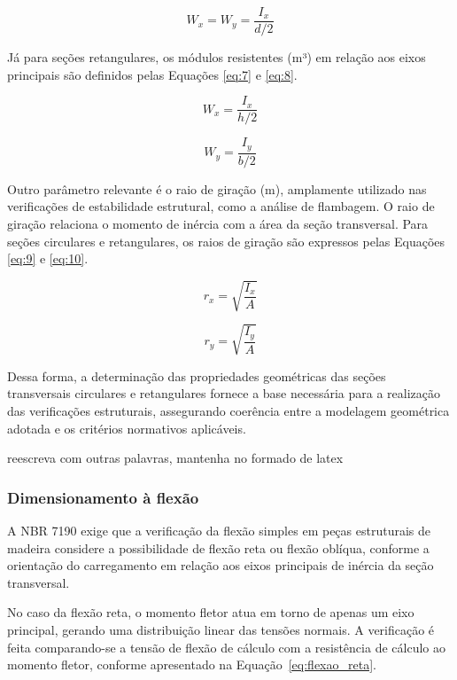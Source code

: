 \begin{equation}
W_x = W_y = \frac{I_x}{d/2}
\label{eq:6}
\end{equation}

Já para seções retangulares, os módulos resistentes (m³) em relação aos eixos principais são definidos pelas Equações \eqref{eq:7} e \eqref{eq:8}.

\begin{equation}
W_x = \frac{I_x}{h/2}
\label{eq:7}
\end{equation}

\begin{equation}
W_y = \frac{I_y}{b/2}
\label{eq:8}
\end{equation}

Outro parâmetro relevante é o raio de giração (m), amplamente utilizado nas verificações de estabilidade estrutural, como a análise de flambagem. O raio de giração relaciona o momento de inércia com a área da seção transversal. Para seções circulares e retangulares, os raios de giração são expressos pelas Equações \eqref{eq:9} e \eqref{eq:10}.

\begin{equation}
r_x = \sqrt{\frac{I_x}{A}}
\label{eq:9}
\end{equation}

\begin{equation}
r_y = \sqrt{\frac{I_y}{A}}
\label{eq:10}
\end{equation}

Dessa forma, a determinação das propriedades geométricas das seções transversais circulares e retangulares fornece a base necessária para a realização das verificações estruturais, assegurando coerência entre a modelagem geométrica adotada e os critérios normativos aplicáveis.

reescreva com outras palavras, mantenha no formado de latex 

\subsubsection{Dimensionamento à flexão}

A NBR 7190 \parencite{NBR7190-1:2022} exige que a verificação da flexão simples em peças estruturais de madeira considere a possibilidade de flexão reta ou flexão oblíqua, conforme a orientação do carregamento em relação aos eixos principais de inércia da seção transversal.

No caso da flexão reta, o momento fletor atua em torno de apenas um eixo principal, gerando uma distribuição linear das tensões normais. A verificação é feita comparando-se a tensão de flexão de cálculo com a resistência de cálculo ao momento fletor, conforme apresentado na Equação~\eqref{eq:flexao_reta}.

